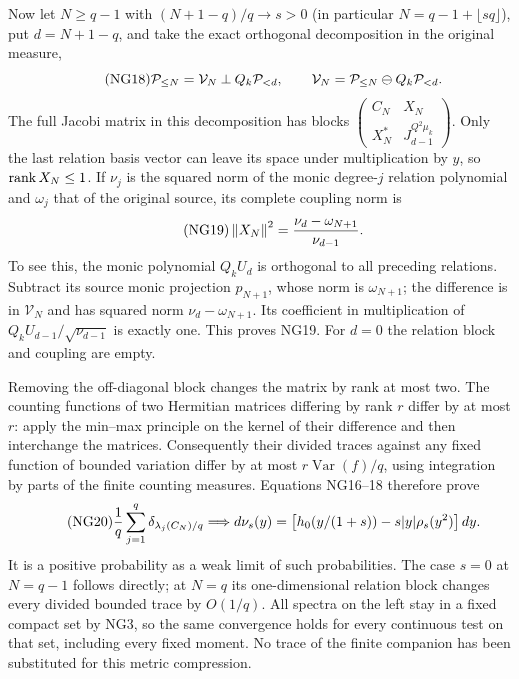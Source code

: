 Now let $N\ge q-1$ with $(N+1-q)/q\to s>0$ (in particular
$N=q-1+\lfloor sq\rfloor$), put $d=N+1-q$, and take the exact
orthogonal decomposition in the original measure,
\begin{equation}\tag{NG18}
 \mathcal P_{\le N}=\mathcal V_N\mathbin{\perp}Q_k\mathcal P_{<d},\qquad
 \mathcal V_N=\mathcal P_{\le N}\ominus Q_k\mathcal P_{<d}.
\end{equation}
The full Jacobi matrix in this decomposition has blocks
$\left(\begin{smallmatrix}C_N&X_N\\X_N^*&J_{d-1}^{Q^2\mu_k}\end{smallmatrix}\right)$.
Only the last relation basis vector can leave its space under
multiplication by $y$, so $\operatorname{rank} X_N\le1$.
If $\nu_j$ is the squared norm of the monic degree-$j$ relation
polynomial and $\omega_j$ that of the original source, its complete
coupling norm is
\begin{equation}\tag{NG19}
 \left\lVert X_N\right\rVert^2=\frac{\nu_d-\omega_{N+1}}{\nu_{d-1}}.
\end{equation}
To see this, the monic polynomial $Q_kU_d$ is orthogonal to all preceding
relations. Subtract its source monic projection $p_{N+1}$, whose norm
is $\omega_{N+1}$; the difference is in $\mathcal V_N$ and has squared
norm $\nu_d-\omega_{N+1}$. Its coefficient in multiplication of
$Q_kU_{d-1}/\sqrt{\nu_{d-1}}$ is exactly one. This proves NG19.
For $d=0$ the relation block and coupling are empty.

Removing the off-diagonal block changes the matrix by rank at most two.
The counting functions of two Hermitian matrices differing by rank $r$
differ by at most $r$: apply the min--max principle on the kernel of
their difference and then interchange the matrices. Consequently their
divided traces against any fixed function of bounded variation differ
by at most $r\operatorname{Var}(f)/q$, using integration by parts of
the finite counting measures. Equations NG16--18 therefore prove
\begin{equation}\tag{NG20}
 \frac1q\sum_{j=1}^q\delta_{\lambda_j(C_N)/q}\Longrightarrow
 d\nu_s(y)=\bigl[h_0(y/(1+s))-s|y|\rho_s(y^2)\bigr]\,d y.
\end{equation}
It is a positive probability as a weak limit of such probabilities.
The case $s=0$ at $N=q-1$ follows directly; at $N=q$ its one-dimensional
relation block changes every divided bounded trace by $O(1/q)$.
All spectra on the left stay in a fixed compact set by NG3, so the
same convergence holds for every continuous test on that set, including
every fixed moment. No trace of the finite companion has been substituted
for this metric compression.

